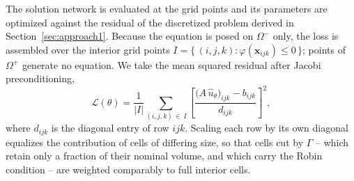
The solution network is evaluated at the grid points and its parameters are optimized
against the residual of the discretized problem derived in
Section~\ref{sec:approach1}. Because the equation is posed on $\Omega^{-}$ only, the
loss is assembled over the interior grid points
$I = \{\,(i,j,k) : \varphi(\mathbf{x}_{ijk}) \leq 0\,\}$; points of $\Omega^{+}$
generate no equation. We take the mean squared residual after Jacobi preconditioning,
\begin{equation}
  \mathcal{L}(\theta)
  = \frac{1}{|I|} \sum_{(i,j,k)\, \in\, I}
    \left[
      \frac{\bigl(A\,\hat{u}_{\theta}\bigr)_{ijk} - b_{ijk}}{d_{ijk}}
    \right]^{2},
  \label{eq:loss}
\end{equation}
where $d_{ijk}$ is the diagonal entry of row $ijk$. Scaling each row by its own
diagonal equalizes the contribution of cells of differing size, so that cells cut by
$\Gamma$ -- which retain only a fraction of their nominal volume, and which carry the
Robin condition -- are weighted comparably to full interior cells.
